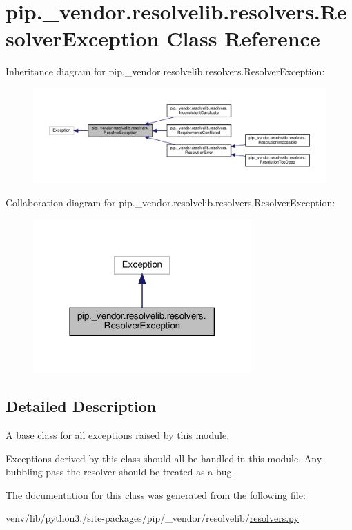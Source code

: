 \hypertarget{classpip_1_1__vendor_1_1resolvelib_1_1resolvers_1_1ResolverException}{}\section{pip.\+\_\+vendor.\+resolvelib.\+resolvers.\+Resolver\+Exception Class Reference}
\label{classpip_1_1__vendor_1_1resolvelib_1_1resolvers_1_1ResolverException}


Inheritance diagram for pip.\+\_\+vendor.\+resolvelib.\+resolvers.\+Resolver\+Exception\+:
\nopagebreak
\begin{figure}[H]
\begin{center}
\leavevmode
\includegraphics[width=350pt]{classpip_1_1__vendor_1_1resolvelib_1_1resolvers_1_1ResolverException__inherit__graph}
\end{center}
\end{figure}


Collaboration diagram for pip.\+\_\+vendor.\+resolvelib.\+resolvers.\+Resolver\+Exception\+:
\nopagebreak
\begin{figure}[H]
\begin{center}
\leavevmode
\includegraphics[width=237pt]{classpip_1_1__vendor_1_1resolvelib_1_1resolvers_1_1ResolverException__coll__graph}
\end{center}
\end{figure}


\subsection{Detailed Description}
\begin{DoxyVerb}A base class for all exceptions raised by this module.

Exceptions derived by this class should all be handled in this module. Any
bubbling pass the resolver should be treated as a bug.
\end{DoxyVerb}
 

The documentation for this class was generated from the following file\+:\begin{DoxyCompactItemize}
\item 
venv/lib/python3./site-\/packages/pip/\+\_\+vendor/resolvelib/\hyperlink{resolvers_8py}{resolvers.\+py}\end{DoxyCompactItemize}
